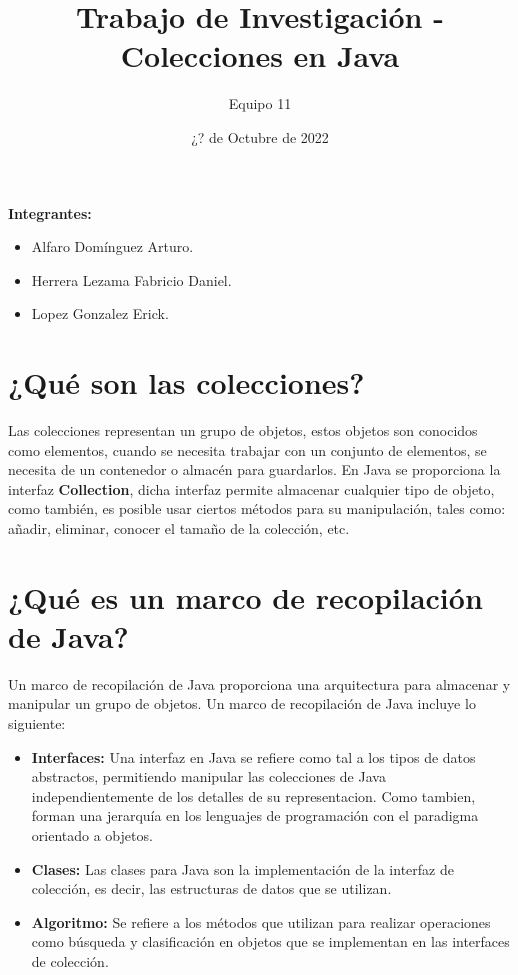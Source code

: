 \documentclass[12pt, letterpaper]{article} %
\title{Trabajo de Investigación - Colecciones en Java}
\author{Equipo 11}
\date{¿? de Octubre de 2022}
\begin{document}
\maketitle %


\textbf{Integrantes:}
\begin{itemize}
    \item Alfaro Domínguez Arturo.
    \item Herrera Lezama Fabricio Daniel.
    \item Lopez Gonzalez Erick.
\end{itemize}

\section*{¿Qué son las colecciones?}

Las colecciones representan un grupo de objetos, estos objetos son conocidos como elementos, cuando se necesita trabajar con un conjunto de elementos, se necesita de un contenedor o almacén para guardarlos. En Java se proporciona la interfaz \textbf{Collection}, dicha interfaz permite almacenar cualquier tipo de objeto, como también, es posible usar ciertos métodos para su manipulación, tales como: añadir, eliminar, conocer el tamaño de la colección, etc.
\section*{¿Qué es un marco de recopilación de Java?}

Un marco de recopilación de Java proporciona una arquitectura para almacenar y manipular un grupo de objetos. Un marco de recopilación de Java incluye lo siguiente:

\begin{itemize}
    \item \textbf{Interfaces:} Una interfaz en Java se refiere como tal a los tipos de datos abstractos, permitiendo manipular las colecciones de Java independientemente de los detalles de su representacion. Como tambien, forman una jerarquía en los lenguajes de programación con el paradigma orientado a objetos.
    \item \textbf{Clases:} Las clases para Java son la implementación de la interfaz de colección, es decir, las estructuras de datos que se utilizan.
    \item \textbf{Algoritmo:} Se refiere a los métodos que utilizan para realizar operaciones como búsqueda y clasificación en objetos que se implementan en las interfaces de colección.
    
\end{itemize}
\end{document}
